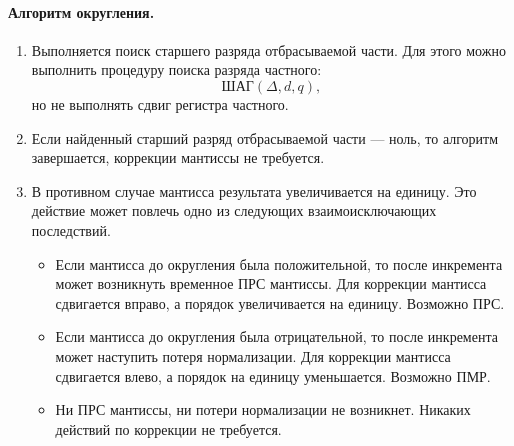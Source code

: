 \paragraph{Алгоритм округления.}
\begin{enumerate}
    \item Выполняется поиск старшего разряда отбрасываемой части. Для этого можно выполнить процедуру поиска разряда частного:
    \[
        \text{ШАГ}(\Delta,d,q),
    \]
    но не выполнять сдвиг регистра частного.
    
    \item Если найденный старший разряд отбрасываемой части --- ноль, то алгоритм завершается, коррекции мантиссы не требуется.
    
    \item В противном случае мантисса результата увеличивается на единицу. Это действие может повлечь одно из следующих взаимоисключающих последствий.
    \begin{itemize}
        \item Если мантисса до округления была положительной, то после инкремента может возникнуть временное ПРС мантиссы. Для коррекции мантисса сдвигается вправо, а порядок увеличивается на единицу. Возможно ПРС.
        
        \item Если мантисса до округления была отрицательной, то после инкремента может наступить потеря нормализации. Для коррекции мантисса сдвигается влево, а порядок на единицу уменьшается. Возможно ПМР.
        
        \item Ни ПРС мантиссы, ни потери нормализации не возникнет. Никаких действий по коррекции не требуется.
    \end{itemize}
\end{enumerate}


